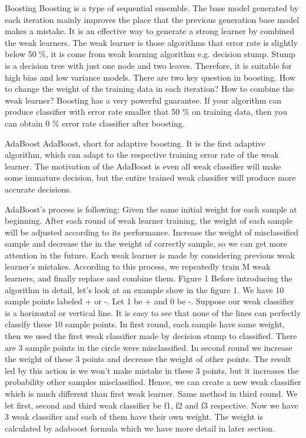 \documentclass[../SMLreport_template.tex]{subfiles}
\begin{document}
Boosting
Boosting is a type of sequential ensemble. The base model generated by each iteration mainly improves the place that the previous generation base model makes a mistake. It is an effective way to generate a strong learner by combined the weak learners. The weak learner is those algorithms that error rate is slightly below 50 $\%$, it is come from weak learning algorithm e.g. decision stump. Stump is a decision tree with just one node and two leaves. Therefore, it is suitable for high bias and low variance models.
There are two key question in boosting. How to change the weight of the training data in each iteration? How to combine the weak learner?
Boosting has a very powerful guarantee. If your algorithm can produce classifier with error rate smaller that 50 $\%$ on training data, then you can obtain 0 $\%$ error rate classifier after boosting.

AdaBoost
AdaBoost, short for adaptive boosting. It is the first adaptive algorithm, which can adapt to the respective training error rate of the weak learner. 
The motivation of the AdaBoost is even all weak classifier will make some immature decision, but the entire trained weak classifier will produce more accurate decisions. 

AdaBoost's process is following:
Given the same initial weight for each sample at beginning. After each round of weak learner training, the weight of each sample will be adjusted according to its performance. Increase the weight of misclassified sample and decrease the in the weight of correctly sample, so we can get more attention in the future. Each weak learner is made by considering previous weak learner’s mistakes.  According to this process, we repeatedly train M weak learners, and finally replace and combine them.
Figure 1
Before introducing the algorithm in detail, let's look at an example show in the figure 1. 
We have 10 sample points labeled + or -. Let 1 be + and 0 be -. Suppose our weak classifier is a horizontal or vertical line. It is easy to see that none of the lines can perfectly classify these 10 sample points. In first round, each sample have same weight, then we used the first weak classifier made by decision stump to classified. There are 3 sample points in the circle were misclassified. In second round we increase the weight of these 3 points and decrease the weight of other points. The result led by this action is we won’t make mistake in these 3 points, but it increases the probability other samples misclassified. Hence, we can create a new weak classifier which is much different than first weak learner. Same method in third round. We let first, second and third weak classifier be f1, f2 and f3 respective. Now we have 3 weak classifier and each of them have their own weight. The weight is calculated by adaboost formula which we have more detail in later section.
\end{document}
